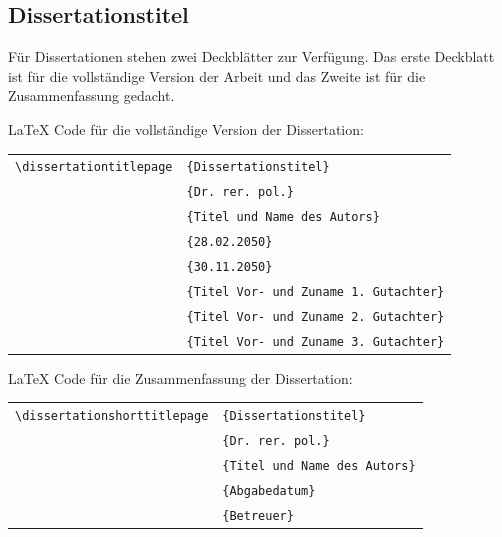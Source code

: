\documentclass[english, trackchanges, hyperref, ngerman ,pdf, mp, mppdf]{wise}
\newcommand\code[1]{\texttt{#1}}
\newcommand\command[1]{\code{\textbackslash{}#1}}
\begin{document}
\begin{appendix}\begin{appendices}


\section{Dissertationstitel}\label{sec:titelblatt_dissertationen}

Für Dissertationen stehen zwei Deckblätter zur Verfügung. Das erste
Deckblatt ist für die vollständige Version der Arbeit und das Zweite
ist für die Zusammenfassung gedacht.

\LaTeX{} Code für die vollständige Version der Dissertation:

\vspace{0.3cm}
\begin{center}\begin{tabular}{ll}
\command{dissertationtitlepage}&
\code{\{Dissertationstitel\}}\\
&
\code{\{Dr.\,rer.\,pol.\}}\\
&
\code{\{Titel und Name des Autors\}}\\
&
\code{\{28.02.2050\}}\\
&
\code{\{30.11.2050\}}\\
&
\code{\{Titel Vor- und Zuname 1. Gutachter\}}\\
&
\code{\{Titel Vor- und Zuname 2. Gutachter\}}\\
&
\code{\{Titel Vor- und Zuname 3. Gutachter\}}\\
\end{tabular}\end{center}
\vspace{0.3cm}

\clearpage


\clearpage

\LaTeX{} Code für die Zusammenfassung der Dissertation:

\vspace{0.3cm}
\begin{center}\begin{tabular}{ll}
\command{dissertationshorttitlepage}&
\code{\{Dissertationstitel\}}\\
&
\code{\{Dr.\,rer.\,pol.\}}\\
&
\code{\{Titel und Name des Autors\}}\\
&
\code{\{Abgabedatum\}}\\
&
\code{\{Betreuer\}}\\
\end{tabular}\end{center}
\vspace{0.3cm}


\end{appendices}
\end{appendix}
\end{document}
